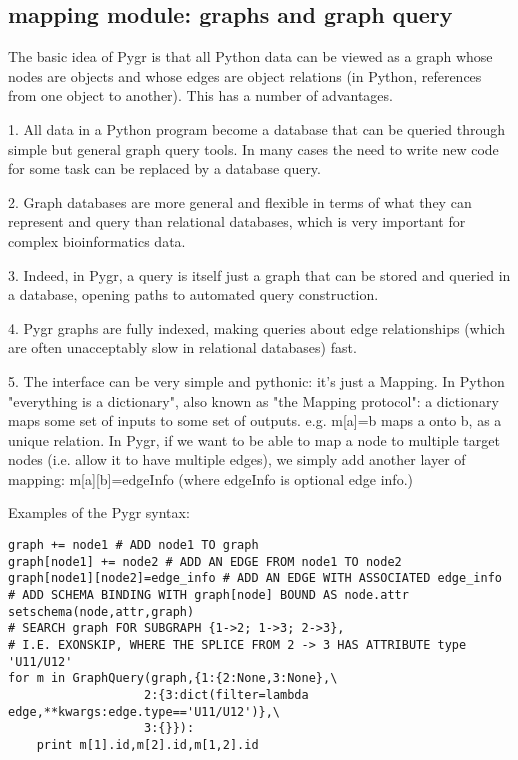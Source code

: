\documentclass{howto}
\begin{document}
\subsection{mapping module: graphs and graph query}
\label{graphs-query}

The basic idea of Pygr is that all Python data can be viewed as a graph whose nodes are objects and whose edges are object relations (in Python, references from one object to another).  This has a number of advantages. 

   1. All data in a Python program become a database  that can be queried through simple but general graph query tools.  In many cases the need to write new code for some task can be replaced by a database query. 

   2. Graph databases are more general and flexible in terms of what they can represent and query than relational databases, which is very important for complex bioinformatics data.

   3. Indeed, in Pygr, a query is itself just a graph that can be stored and queried in a database, opening paths to automated query construction.

   4. Pygr graphs are fully indexed, making queries about edge relationships (which are often unacceptably slow in relational databases) fast.

   5. The interface can be very simple and pythonic: it's just a Mapping.  In Python "everything is a dictionary", also known as "the Mapping protocol": a dictionary maps some set of inputs to some set of outputs. e.g. m[a]=b maps a onto b, as a unique relation.  In Pygr, if we want to be able to map a node to multiple target nodes (i.e. allow it to have multiple edges), we simply add another layer of mapping: m[a][b]=edgeInfo (where edgeInfo is optional edge info.)

Examples of the Pygr syntax:

\begin{verbatim}
graph += node1 # ADD node1 TO graph
graph[node1] += node2 # ADD AN EDGE FROM node1 TO node2
graph[node1][node2]=edge_info # ADD AN EDGE WITH ASSOCIATED edge_info
# ADD SCHEMA BINDING WITH graph[node] BOUND AS node.attr
setschema(node,attr,graph) 
# SEARCH graph FOR SUBGRAPH {1->2; 1->3; 2->3}, 
# I.E. EXONSKIP, WHERE THE SPLICE FROM 2 -> 3 HAS ATTRIBUTE type 'U11/U12' 
for m in GraphQuery(graph,{1:{2:None,3:None},\
                   2:{3:dict(filter=lambda edge,**kwargs:edge.type=='U11/U12')},\
                   3:{}}):
    print m[1].id,m[2].id,m[1,2].id
\end{verbatim}
\end{document}
